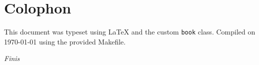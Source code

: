 


\printindex

\chapter*{Colophon}

This document was typeset using \LaTeX{} and the custom \texttt{book} class. 
Compiled on \today{} using the provided Makefile.

\vspace{1cm}
\begin{center}
\textit{Finis}
\end{center}